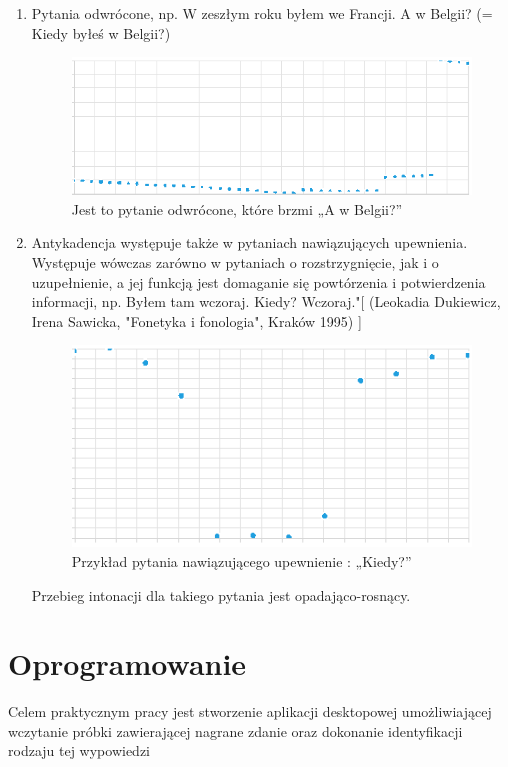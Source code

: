 \documentclass[a4paper,12 pt]{article}
\begin{document}
\begin{enumerate}
\begin{enumerate}
\item Pytania odwrócone, np. W zeszłym roku byłem we Francji. A w Belgii? (= Kiedy byłeś w Belgii?) 
\begin{figure}[h]
\centering
\includegraphics[scale=0.9]{pytanie_odwrocone.png}
\caption{Jest to pytanie odwrócone, które brzmi „A w Belgii?”}
\end{figure}
\FloatBarrier
\item Antykadencja występuje  także w pytaniach nawiązujących upewnienia. Występuje wówczas zarówno w  pytaniach o rozstrzygnięcie, jak i o uzupełnienie, a jej funkcją jest domaganie  się powtórzenia i potwierdzenia informacji, np. Byłem tam wczoraj. Kiedy?  Wczoraj."[  (Leokadia Dukiewicz, Irena Sawicka, "Fonetyka i fonologia", Kraków 1995) ]
\begin{figure}[h]

\centering
\includegraphics[scale=0.9]{kiedy.png}
\caption{Przykład pytania nawiązującego upewnienie : „Kiedy?”}

\end{figure}
\FloatBarrier
Przebieg intonacji dla takiego pytania jest opadająco-rosnący.
\end{enumerate}
\end{enumerate}
\section{Oprogramowanie}
Celem praktycznym pracy jest stworzenie aplikacji desktopowej umożliwiającej wczytanie próbki zawierającej nagrane zdanie oraz dokonanie identyfikacji rodzaju tej wypowiedzi
\end{document}
